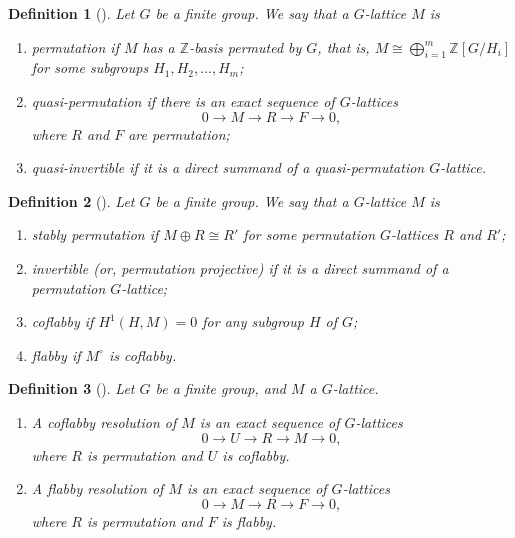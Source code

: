 \documentclass[10pt,a4paper]{amsart}
\newtheorem{dfn}{Definition}
\newcommand{\Z}{\mathbb{Z}}
\begin{document}
\begin{dfn}[{\cite[\S 1]{Endo2011}}]
Let $G$ be a finite group. We say that a $G$-lattice $M$ is
\begin{enumerate}
    \item \emph{permutation} if $M$ has a $\Z$-basis permuted by $G$, that is, $M\cong \bigoplus_{i=1}^{m}\Z[G/H_i]$ for some subgroups $H_1,H_2,\dots, H_m$;
    \item \emph{quasi-permutation} if there is an exact sequence of $G$-lattices
    \begin{equation*}
        0\rightarrow M \rightarrow R \rightarrow F \rightarrow 0, 
    \end{equation*}
    where $R$ and $F$ are permutation;
    \item \emph{quasi-invertible} if it is a direct summand of a quasi-permutation $G$-lattice. 
\end{enumerate}
\end{dfn}

\begin{dfn}[{\cite[\S\S 2.3--2.5]{Lorenz2005}}]
Let $G$ be a finite group. We say that a $G$-lattice $M$ is
\begin{enumerate}
\item \emph{stably permutation} if $M\oplus R\cong R'$ for some permutation $G$-lattices $R$ and $R'$;
\item \emph{invertible} (or, \emph{permutation projective}) if it is a direct summand of a permutation $G$-lattice;
\item \emph{coflabby} if $H^{1}(H,M)=0$ for any subgroup $H$ of $G$;
\item \emph{flabby} if $M^{\circ}$ is coflabby. 
\end{enumerate}
\end{dfn}

\begin{dfn}[{\cite[\S 2.6]{Lorenz2005}}]
Let $G$ be a finite group, and $M$ a $G$-lattice. 
\begin{enumerate}
\item A \emph{coflabby resolution} of $M$ is an exact sequence of $G$-lattices
\begin{equation*}
0\rightarrow U \rightarrow R \rightarrow M \rightarrow 0, 
\end{equation*}
where $R$ is permutation and $U$ is coflabby. 
\item A \emph{flabby resolution} of $M$ is an exact sequence of $G$-lattices
\begin{equation*}
0\rightarrow M \rightarrow R \rightarrow F \rightarrow 0, 
\end{equation*}
where $R$ is permutation and $F$ is flabby. 
\end{enumerate}
\end{dfn}
\end{document}
